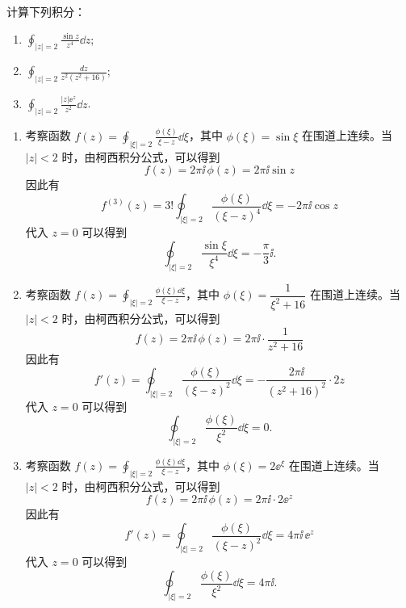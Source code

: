 \begin{question}
计算下列积分：

\begin{enumerate}
  \item \(\displaystyle \oint_{|z|=2} \frac{\sin z}{z^4}\dd{z}\);\qquad
  \item \(\displaystyle \oint_{|z|=2} \frac{dz}{z^2(z^2+16)}\);\qquad
  \item \(\displaystyle \oint_{|z|=2} \frac{|z|\ee^{z}}{z^2}\dd{z}\).

\end{enumerate}
\begin{solution}

\begin{enumerate}
  \item 考察函数 \(f(z)=\displaystyle\oint_{|\xi|=2} \frac{\phi(\xi)}{\xi-z}\dd{\xi}\)，其中 \(\phi(\xi)=\sin\xi\) 在围道上连续。当 \(|z|<2\) 时，由柯西积分公式，可以得到
\[ f(z)=2\pi\ii\,\phi(z)=2\pi\ii\sin z \]
因此有
 \[ f^{(3)}(z)=3! \oint_{|\xi|=2} \frac{\phi(\xi)}{(\xi-z)^4}\dd{\xi} = -2\pi\ii\cos z \]
代入 \(z=0\) 可以得到
 \[ \oint_{|\xi|=2} \frac{\sin\xi}{\xi^4}\dd{\xi} = -\frac{\pi}{3}\ii. \]

  \item 考察函数 \(f(z)=\displaystyle\oint_{|\xi|=2} \frac{\phi(\xi)\dd{\xi}}{\xi-z}\)，其中 \(\phi(\xi)=\dfrac1{\xi^2+16}\) 在围道上连续。当 \(|z|<2\) 时，由柯西积分公式，可以得到
\[ f(z)=2\pi\ii\,\phi(z)=2\pi\ii\cdot\frac1{z^2+16} \]
因此有
\[ f'(z)=\oint_{|\xi|=2} \frac{\phi(\xi)}{(\xi-z)^2}\dd{\xi} = -\frac{2\pi\ii}{(z^2+16)^2}\cdot 2z \]
代入 \(z=0\) 可以得到
\[ \oint_{|\xi|=2} \frac{\phi(\xi)}{\xi^2}\dd{\xi} = 0. \]

  \item 考察函数 \(f(z)=\displaystyle\oint_{|\xi|=2} \frac{\phi(\xi)\dd{\xi}}{\xi-z}\)，其中 \(\phi(\xi)=2\ee^{\xi}\) 在围道上连续。当 \(|z|<2\) 时，由柯西积分公式，可以得到
\[ f(z)=2\pi\ii\,\phi(z)=2\pi\ii\cdot2\ee^{z} \]
因此有
\[ f'(z)=\oint_{|\xi|=2} \frac{\phi(\xi)}{(\xi-z)^2}\dd{\xi} = 4\pi\ii\,\ee^{z} \]
代入 \(z=0\) 可以得到
\[ \oint_{|\xi|=2} \frac{\phi(\xi)}{\xi^2}\dd{\xi} = 4\pi\ii. \]
\end{enumerate}
\end{solution}
\end{question}

